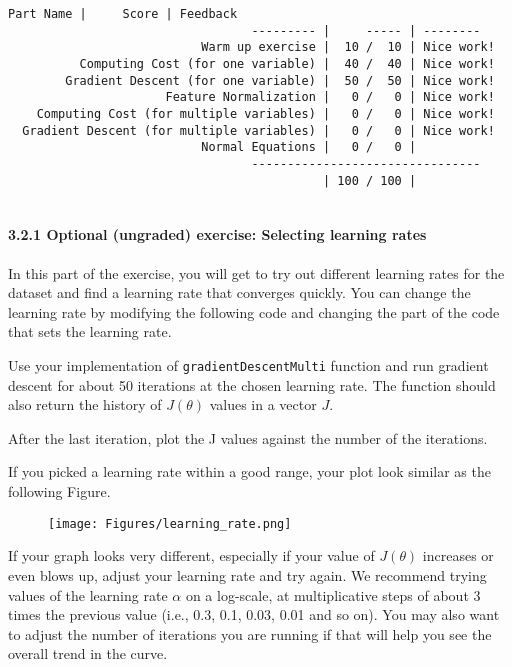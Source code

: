 \documentclass[11pt]{article}
\makeatletter
\def\maxwidth{\ifdim\Gin@nat@width>\linewidth\linewidth
    \else\Gin@nat@width\fi}
\let\Oldincludegraphics\includegraphics
\renewcommand{\includegraphics}[1]{\Oldincludegraphics[width=.8\maxwidth]{#1}}
\makeatother
\begin{document}
    \begin{Verbatim}[commandchars=\\\{\}]
                                  Part Name |     Score | Feedback
                                  --------- |     ----- | --------
                           Warm up exercise |  10 /  10 | Nice work!
          Computing Cost (for one variable) |  40 /  40 | Nice work!
        Gradient Descent (for one variable) |  50 /  50 | Nice work!
                      Feature Normalization |   0 /   0 | Nice work!
    Computing Cost (for multiple variables) |   0 /   0 | Nice work!
  Gradient Descent (for multiple variables) |   0 /   0 | Nice work!
                           Normal Equations |   0 /   0 | 
                                  --------------------------------
                                            | 100 / 100 |  


    \end{Verbatim}

    \paragraph{3.2.1 Optional (ungraded) exercise: Selecting learning
rates}\label{optional-ungraded-exercise-selecting-learning-rates}

In this part of the exercise, you will get to try out different learning
rates for the dataset and find a learning rate that converges quickly.
You can change the learning rate by modifying the following code and
changing the part of the code that sets the learning rate.

Use your implementation of \texttt{gradientDescentMulti} function and
run gradient descent for about 50 iterations at the chosen learning
rate. The function should also return the history of \(J(\theta)\)
values in a vector \(J\).

After the last iteration, plot the J values against the number of the
iterations.

If you picked a learning rate within a good range, your plot look
similar as the following Figure.

\begin{figure}
\centering
\texttt{[image: Figures/learning\_rate.png]}
\caption{}
\end{figure}

If your graph looks very different, especially if your value of
\(J(\theta)\) increases or even blows up, adjust your learning rate and
try again. We recommend trying values of the learning rate \(\alpha\) on
a log-scale, at multiplicative steps of about 3 times the previous value
(i.e., 0.3, 0.1, 0.03, 0.01 and so on). You may also want to adjust the
number of iterations you are running if that will help you see the
overall trend in the curve.
\end{document}
